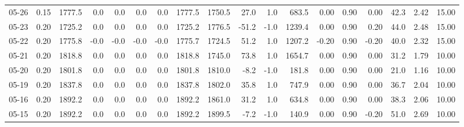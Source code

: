 \begin{threeparttable}
{\begin{tabular}{lrrrrrrrrrrrrrrrrr}
  05-26 &     0.15 & 1777.5 &               0.0 &               0.0 &                0.0 &                0.0 & 1777.5 & 1750.5 &       27.0 &                      1.0 &               683.5 &       0.00 &      0.90 &           0.00 &             42.3 &            2.42 &                  15.00 \\
  05-23 &     0.20 & 1725.2 &               0.0 &               0.0 &                0.0 &                0.0 & 1725.2 & 1776.5 &      -51.2 &                     -1.0 &              1239.4 &       0.00 &      0.90 &           0.20 &             44.0 &            2.48 &                  15.00 \\
  05-22 &     0.20 & 1775.8 &              -0.0 &              -0.0 &               -0.0 &               -0.0 & 1775.7 & 1724.5 &       51.2 &                      1.0 &              1207.2 &      -0.20 &      0.90 &          -0.20 &             40.0 &            2.32 &                  15.00 \\
  05-21 &     0.20 & 1818.8 &               0.0 &               0.0 &                0.0 &                0.0 & 1818.8 & 1745.0 &       73.8 &                      1.0 &              1654.7 &       0.00 &      0.90 &           0.00 &             31.2 &            1.79 &                  10.00 \\
  05-20 &     0.20 & 1801.8 &               0.0 &               0.0 &                0.0 &                0.0 & 1801.8 & 1810.0 &       -8.2 &                     -1.0 &               181.8 &       0.00 &      0.90 &           0.00 &             21.0 &            1.16 &                  10.00 \\
  05-19 &     0.20 & 1837.8 &               0.0 &               0.0 &                0.0 &                0.0 & 1837.8 & 1802.0 &       35.8 &                      1.0 &               747.9 &       0.00 &      0.90 &           0.00 &             36.7 &            2.04 &                  10.00 \\
  05-16 &     0.20 & 1892.2 &               0.0 &               0.0 &                0.0 &                0.0 & 1892.2 & 1861.0 &       31.2 &                      1.0 &               634.8 &       0.00 &      0.90 &           0.00 &             38.3 &            2.06 &                  10.00 \\
  05-15 &     0.20 & 1892.2 &               0.0 &               0.0 &                0.0 &                0.0 & 1892.2 & 1899.5 &       -7.2 &                     -1.0 &               140.9 &       0.00 &      0.90 &          -0.20 &             51.0 &            2.69 &                  10.00 \\

\end{tabular}}
\end{threeparttable}

